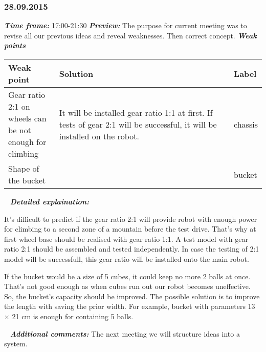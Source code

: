\subsubsection{28.09.2015}
	\textit{\textbf{Time frame:}} 17:00-21:30 \newline
	\textit{\textbf{Preview:}} The purpose for current meeting was to revise all our previous ideas and reveal weaknesses. Then correct concept.\newline \newline
	\textit{\textbf{Weak points}}

  \begin{table}[H]
	\vspace{-2mm}
	\begin{center}
		\begin{tabular}{|p{0.2\linewidth}|p{0.7\linewidth}|p{0.1\linewidth}|}
			\hline
			Weak point & Solution & Label \\
			\hline
			Gear ratio 2:1 on wheels can be not enough for climbing & It will be installed gear ratio 1:1 at first. If tests of gear 2:1 will be successful, it will be installed on the robot. & chassis \\
			\hline
			Shape of the bucket &  & bucket \\
			\hline
		\end{tabular}
	\end{center}
  \end{table}
  
   \newline
  \textit{\textbf{Detailed explaination:}}
  \begin{enumerate*}
  	\item It's difficult to predict if the gear ratio 2:1 will provide robot with enough power for climbing to a second zone of a mountain before the test drive. That's why at first wheel base should be realised with gear ratio 1:1. A test model with gear ratio 2:1 should be assembled and tested independently. In case the testing of 2:1 model will be successfull, this gear ratio will be installed onto the main robot.
  	
  	
  	\item If the bucket would be a size of 5 cubes, it could keep no more 2 balls at once. That's not good enough as when cubes run out our robot becomes uneffective. So, the bucket's capacity should be improved. The possible solution is to improve the length with saving the prior width. For example, bucket with parameters 13 $\times$ 21 cm is enough for containing 5 balls.
  	
  \end{enumerate*}
  
   \newline
  \textit{\textbf{Additional comments:}} The next meeting we will structure ideas into a system.
  
\fillpage
